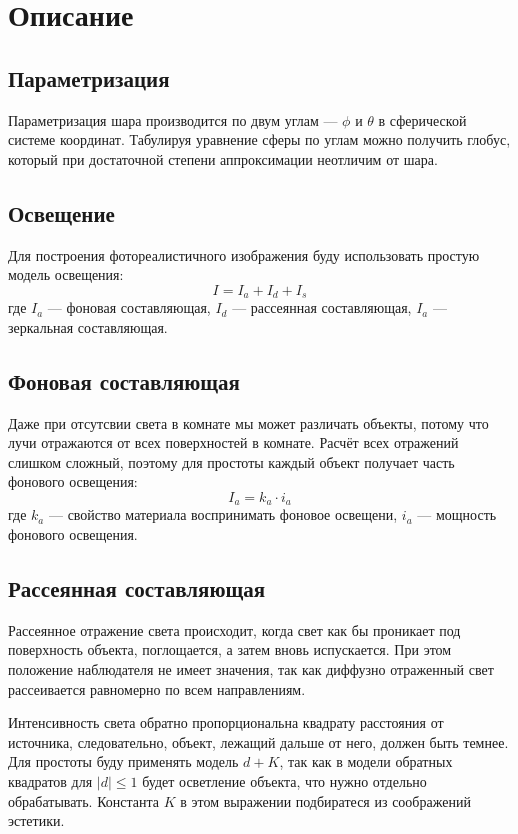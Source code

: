 \section{Описание}
\subsection*{Параметризация}
Параметризация шара производится по двум углам --- $\phi$ и $\theta$ в сферической системе координат. Табулируя уравнение сферы по углам можно получить глобус, который при достаточной степени аппроксимации неотличим от шара.

\subsection*{Освещение}
Для построения фотореалистичного изображения буду использовать простую модель освещения:
\begin{equation*}
    I = I_a + I_d + I_s
\end{equation*}
где $I_a$ --- фоновая составляющая, $I_d$ --- рассеянная составляющая, $I_a$ --- зеркальная составляющая.

\subsection*{Фоновая составляющая}
Даже при отсутсвии света в комнате мы может различать объекты, потому что лучи отражаются от всех поверхностей в комнате. Расчёт всех отражений слишком сложный, поэтому для простоты каждый объект получает часть фонового освещения:
\begin{equation*}
    I_a = k_a \cdot i_a
\end{equation*}
где $k_a$ --- свойство материала воспринимать фоновое освещени, $i_a$ --- мощность фонового освещения.

\subsection*{Рассеянная составляющая}
Рассеянное отражение света происходит, когда свет как бы проникает под поверхность объекта, поглощается, а затем вновь испускается.
При этом положение наблюдателя не имеет значения, так как диффузно отраженный свет рассеивается равномерно по всем направлениям.

Интенсивность света обратно пропорциональна квадрату расстояния от источника, следовательно, объект, лежащий дальше от него, должен быть темнее. Для простоты буду применять модель $d + K$, так как в модели обратных квадратов для $|d| \leqslant 1$ будет осветление объекта, что нужно отдельно обрабатывать. Константа $K$ в этом выражении подбиратеся из соображений эстетики.

